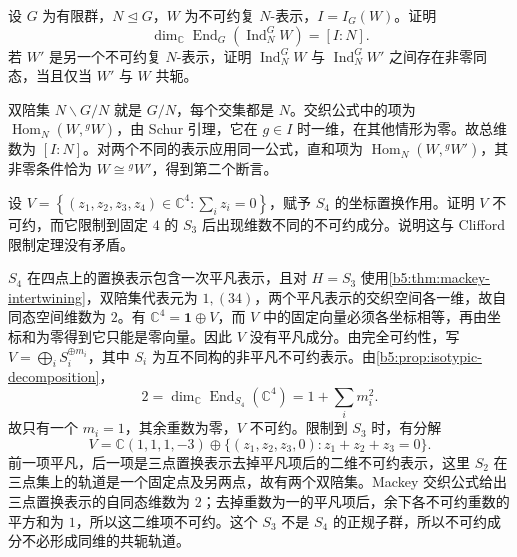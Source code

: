 \begin{exercise}\label{b5:ex:04-normal-induction-end}
	设 \(G\) 为有限群，\(N\trianglelefteq G\)，\(W\) 为不可约复 \(N\)-表示，\(I=I_G(W)\)。证明
	\[
		\dim_{\mathbb C}\operatorname{End}_G \left(\operatorname{Ind}_N^G W\right)=[I:N].
	\]
	若 \(W'\) 是另一个不可约复 \(N\)-表示，证明 \(\operatorname{Ind}_N^G W\) 与 \(\operatorname{Ind}_N^G W'\) 之间存在非零同态，当且仅当 \(W'\) 与 \(W\) 共轭。
\end{exercise}
\begin{solution}
	双陪集 \(N\backslash G/N\) 就是 \(G/N\)，每个交集都是 \(N\)。交织公式中的项为 \(\operatorname{Hom}_N(W,{}^gW)\)，由 Schur 引理，它在 \(g\in I\) 时一维，在其他情形为零。故总维数为 \([I:N]\)。对两个不同的表示应用同一公式，直和项为 \(\operatorname{Hom}_N(W,{}^gW')\)，其非零条件恰为 \(W\cong{}^gW'\)，得到第二个断言。
\end{solution}

\begin{exercise}\label{b5:ex:04-nonnormal-restriction}
	设 \(V=\left\{(z_1,z_2,z_3,z_4)\in\mathbb C^4:\sum_i z_i=0\right\}\)，赋予 \(S_4\) 的坐标置换作用。证明 \(V\) 不可约，而它限制到固定 \(4\) 的 \(S_3\) 后出现维数不同的不可约成分。说明这与 Clifford 限制定理没有矛盾。
\end{exercise}
\begin{solution}
	\(S_4\) 在四点上的置换表示包含一次平凡表示，且对 \(H=S_3\) 使用\cref{b5:thm:mackey-intertwining}，双陪集代表元为 \(1,(34)\)，两个平凡表示的交织空间各一维，故自同态空间维数为 \(2\)。有 \(\mathbb C^4=\mathbf1\oplus V\)，而 \(V\) 中的固定向量必须各坐标相等，再由坐标和为零得到它只能是零向量。因此 \(V\) 没有平凡成分。由完全可约性，写 \(V=\bigoplus_i S_i^{\oplus m_i}\)，其中 \(S_i\) 为互不同构的非平凡不可约表示。由\cref{b5:prop:isotypic-decomposition}，
	\[
		2=\dim_{\mathbb C}\operatorname{End}_{S_4}(\mathbb C^4) =1+\sum_i m_i^2.
	\]
	故只有一个 \(m_i=1\)，其余重数为零，\(V\) 不可约。限制到 \(S_3\) 时，有分解
	\[
		V=\mathbb C(1,1,1,-3) \oplus\bigl\{(z_1,z_2,z_3,0):z_1+z_2+z_3=0\bigr\}.
	\]
	前一项平凡，后一项是三点置换表示去掉平凡项后的二维不可约表示，这里 \(S_2\) 在三点集上的轨道是一个固定点及另两点，故有两个双陪集。Mackey 交织公式给出三点置换表示的自同态维数为 \(2\)；去掉重数为一的平凡项后，余下各不可约重数的平方和为 \(1\)，所以这二维项不可约。这个 \(S_3\) 不是 \(S_4\) 的正规子群，所以不可约成分不必形成同维的共轭轨道。
\end{solution}

